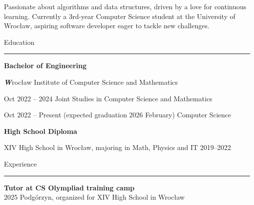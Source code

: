 \documentclass{letter}
\begin{document}
\hfill
\begin{minipage}[t]{0.70\textwidth}
\setlength{\baselineskip}{1.5\baselineskip}

\begin{tcolorbox}[colback=white, colframe=white, width=\textwidth, boxrule=0pt, sharp corners, height=\textheight, left=5mm, right=5mm, top=5mm, bottom=5mm]

\color{black}

\vspace{0.5cm}
{\fontsize{30pt}{1pt} \textbf \FullName}

\vspace{0.3cm}

\begin{spacing}{1.125}
\small 
Passionate about algorithms and data structures, driven by a love for continuous learning. Currently a 3rd-year Computer Science student at the University of Wrocław, aspiring software developer eager to tackle new challenges.

\end{spacing}

\vspace{\SectionSpacing}

{\large Education}
\rule{\linewidth}{0.4pt}

\vspace{-1mm}

{\large \textbf{Bachelor of Engineering}} 

{ 
{\textit \textbf Wrocław Institute of Computer Science and Mathematics}

{\small Oct 2022 -- 2024}
{Joint Studies in Computer Science and Mathematics }

{\small Oct 2022 -- Present (expected graduation 2026 February)}
{Computer Science}

}

{\large \textbf{High School Diploma}}

{ 
{\small XIV High School in Wrocław, majoring in Math, Physics and IT  2019--2022}

}


{\large Experience}
\rule{\linewidth}{0.4pt}

\vspace{-1mm}

{ 

\vspace{1mm}
\textbf{Tutor at CS Olympliad training camp} \\
{\small 2025 Podgórzyn, organized for XIV High School in Wrocław}

}
\end{tcolorbox}
\end{minipage}
\end{document}
